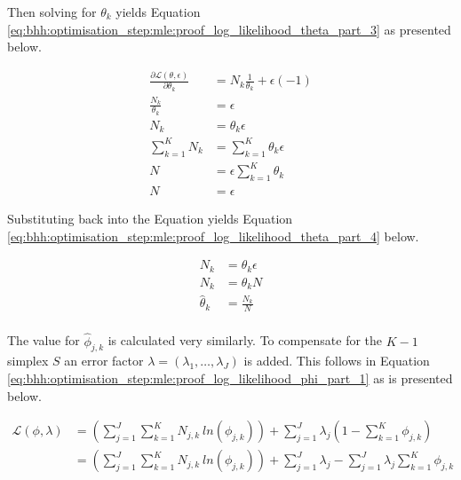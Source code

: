 Then solving for $\theta_{k}$ yields Equation \ref{eq:bhh:optimisation_step:mle:proof_log_likelihood_theta_part_3} as presented below.

\begin{equation}
    \label{eq:bhh:optimisation_step:mle:proof_log_likelihood_theta_part_3}
    \begin{split}
        \frac{\partial \mathcal{L}(\theta, \epsilon)}{\partial \theta_{k}} &=  N_{k} \frac{1}{\theta_{k}}  + \epsilon(-1) \\
        \frac{N_{k}}{\theta_{k}} &= \epsilon \\
        N_{k} &= \theta_{k} \epsilon \\
        \sum_{k=1}^{K} N_{k} &= \sum_{k=1}^{K} \theta_{k} \epsilon \\
        N &= \epsilon \sum_{k=1}^{K} \theta_{k} \\
        N &= \epsilon
    \end{split}
\end{equation}

Substituting back into the Equation yields Equation \ref{eq:bhh:optimisation_step:mle:proof_log_likelihood_theta_part_4} below.

\begin{equation}
    \label{eq:bhh:optimisation_step:mle:proof_log_likelihood_theta_part_4}
    \begin{split}
        N_{k} &= \theta_{k} \epsilon \\
        N_{k} &= \theta_{k} N \\
        \hat{\theta}_{k} &= \frac{N_{k}}{N}\\
    \end{split}
\end{equation}

The value for $\hat{\phi}_{j, k} $ is calculated very similarly. To compensate for the $K-1$ simplex $S$ an error factor $\lambda = (\lambda_{1}, \dots, \lambda_{J})$ is added. This follows in Equation \ref{eq:bhh:optimisation_step:mle:proof_log_likelihood_phi_part_1} as is presented below.

\begin{equation}
    \label{eq:bhh:optimisation_step:mle:proof_log_likelihood_phi_part_1}
    \begin{split}
        \mathcal{L}(\phi, \lambda) 
        &=  \left( \sum_{j=1}^{J} \sum_{k=1}^{K} N_{j,k} \ ln \left( \phi_{j,k} \right) \right) + \sum_{j=1}^{J} \lambda_{j} \left( 1 - \sum_{k=1}^{K} \phi_{j,k} \right) \\
        &=  \left( \sum_{j=1}^{J} \sum_{k=1}^{K} N_{j,k} \ ln \left( \phi_{j,k} \right) \right) + \sum_{j=1}^{J} \lambda_{j} - \sum_{j=1}^{J} \lambda_{j} \sum_{k=1}^{K} \phi_{j,k} \\
    \end{split}
\end{equation}

